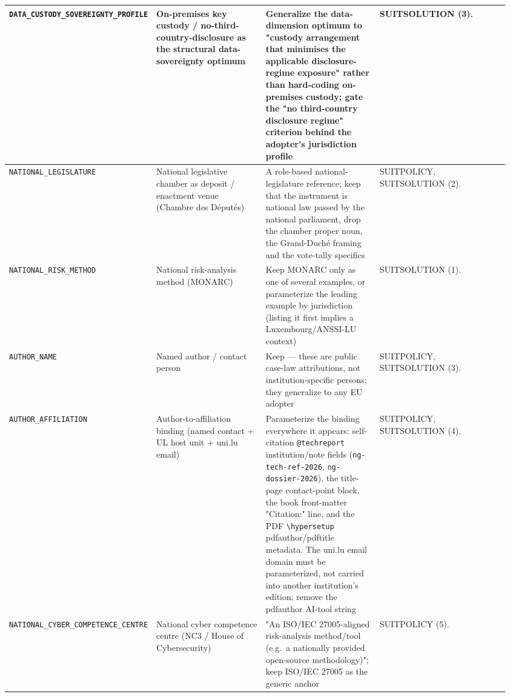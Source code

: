 \begin{center}
\begin{longtable}{@{}p{0.20\linewidth}p{0.24\linewidth}p{0.24\linewidth}p{0.28\linewidth}@{}}
\texttt{DATA\_CUSTODY\_SOVEREIGNTY\_PROFILE} &
On-premises key custody / no-third-country-disclosure as the structural data-sovereignty optimum &
Generalize the data-dimension optimum to "custody arrangement that minimises the applicable disclosure-regime exposure" rather than hard-coding on-premises custody; gate the "no third-country disclosure regime" criterion behind the adopter's jurisdiction profile &
SUITSOLUTION (3).\\
\midrule

\texttt{NATIONAL\_LEGISLATURE} &
National legislative chamber as deposit / enactment venue (Chambre des D\'eput\'es) &
A role-based national-legislature reference; keep that the instrument is national law passed by the national parliament, drop the chamber proper noun, the Grand-Duch\'e framing and the vote-tally specifics &
SUITPOLICY, SUITSOLUTION (2).\\
\midrule

\texttt{NATIONAL\_RISK\_METHOD} &
National risk-analysis method (MONARC) &
Keep MONARC only as one of several examples, or parameterize the leading example by jurisdiction (listing it first implies a Luxembourg/ANSSI-LU context) &
SUITSOLUTION (1).\\
\midrule

\texttt{AUTHOR\_NAME} &
Named author / contact person &
Keep --- these are public case-law attributions, not institution-specific persons; they generalize to any EU adopter &
SUITPOLICY, SUITSOLUTION (3).\\
\midrule

\texttt{AUTHOR\_AFFILIATION} &
Author-to-affiliation binding (named contact + UL host unit + uni.lu email) &
Parameterize the binding everywhere it appears: self-citation \texttt{@techreport} institution/note fields (\texttt{ng-tech-ref-2026}, \texttt{ng-dossier-2026}), the title-page contact-point block, the book front-matter "Citation:" line, and the PDF \texttt{\textbackslash hypersetup} pdfauthor/pdftitle metadata. The uni.lu email domain must be parameterized, not carried into another institution's edition; remove the pdfauthor AI-tool string &
SUITPOLICY, SUITSOLUTION (4).\\
\midrule

\texttt{NATIONAL\_CYBER\_COMPETENCE\_CENTRE} &
National cyber competence centre (NC3 / House of Cybersecurity) &
"An ISO/IEC 27005-aligned risk-analysis method/tool (e.g.\ a nationally provided open-source methodology)"; keep ISO/IEC 27005 as the generic anchor &
SUITPOLICY (5).\\
\midrule


\end{longtable}
\end{center}
